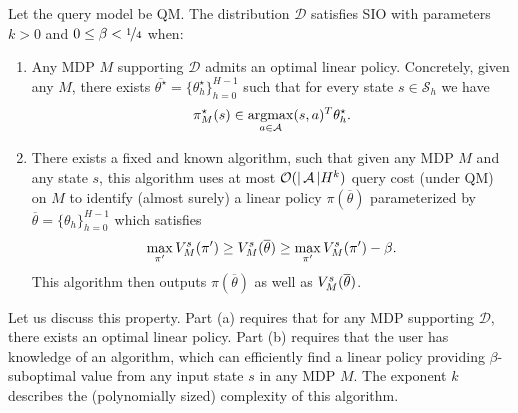 \documentclass[11pt,twoside]{article}
\begin{document}
\begin{property}
Let the query model be QM. The distribution $\mathcal{D}$ satisfies SIO with parameters $k > 0$ and $0 \leq \beta < \nicefrac{1}{4}$ when:
\begin{enumerate}[label=(\alph*), leftmargin=*]
\item Any MDP $M$ supporting $\mathcal{D}$ admits an optimal linear policy. Concretely, given any $M$, there exists $\overline{\theta^\star} = \{ \theta_h^\star \}_{h=0}^{H-1}$ such that for every state $s \in \mathcal{S}_h$ we have
$$
\pi^\star_M(s) \in \operatorname*{argmax}_{a \in \mathcal{A} } (s, a)^T \theta_h^\star.
$$
\item There exists a fixed and known algorithm, such that given any MDP $M$ and any state $s$, this algorithm uses at most $\mathcal{O}(\vert \operatorname{\mathcal{A}} \vert H^{k})$ query cost (under QM) on $M$ to identify (almost surely) a linear policy $\pi(\overline{\theta})$ parameterized by $\overline{\theta} = \{ \theta_h \}_{h=0}^{H-1}$ which satisfies
$$
\max_{\pi'} V^{{s }}_{{M }}({\pi'}) \geq V^{{s }}_{{M }}({\overline{\theta}}) \geq \max_{\pi'} V^{{s }}_{{M }}({\pi'}) - \beta.
$$
This algorithm then outputs $\pi(\overline{\theta})$ as well as $V^{{s }}_{{M }}({\overline{\theta}})$.
\begin{comment}
\item If we sample $M$ from $\mathcal{D}$, but do not query any MDP supporting $\mathcal{D}$ beforehand, then any algorithm that can find (possibly nonlinear) $\pi$ satisfying $\V{s_0}{M}{\pi} \geq \max_{\pi'} \V{s_0}{M}{\pi'} - \nicefrac{1}{4}$, with probability at least $\nicefrac{1}{2}$ over the selection of $M$, requires $\Omega(\vert \ActSet \vert H^k)$ query cost (under QM) on $M$.

 Part (c) requires that the algorithm described in part (b) is minimax optimal, since \emph{any} procedure will need the same complexity to solve an MDP sampled from $\mathcal{D}$, assuming it has not already queried other MDPs beforehand.
\end{comment}
\end{enumerate}
\end{property}
Let us discuss this property. Part (a) requires that for any MDP supporting $\mathcal{D}$, there exists an optimal linear policy. Part (b) requires that the user has knowledge of an algorithm, which can efficiently find a linear policy providing $\beta$-suboptimal value from any input state $s$ in any MDP $M$. The exponent $k$ describes the (polynomially sized) complexity of this algorithm.
\end{document}
